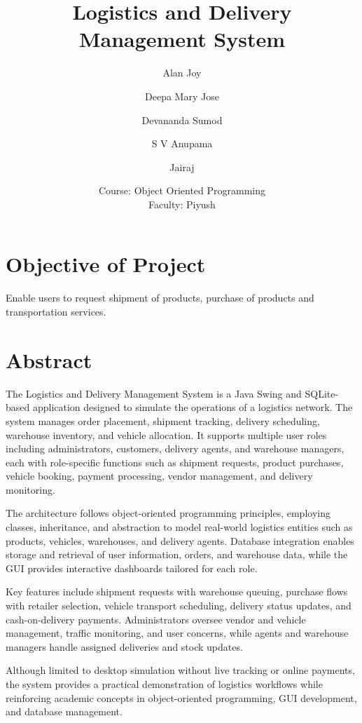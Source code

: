 \documentclass[12pt,a4paper]{article}
\begin{document}
\title{\textbf{Logistics and Delivery Management System}}
\author{
  Alan Joy \and
  Deepa Mary Jose \and
  Devananda Sumod \and
  S V Anupama \and
  Jairaj
}
\date{Course: Object Oriented Programming \\ Faculty: Piyush}
\maketitle


\section*{Objective of Project}
Enable users to request shipment of products, purchase of products and transportation services.

\section*{Abstract}
The Logistics and Delivery Management System is a Java Swing and SQLite-based application designed to simulate the operations of a logistics network. The system manages order placement, shipment tracking, delivery scheduling, warehouse inventory, and vehicle allocation. It supports multiple user roles including administrators, customers, delivery agents, and warehouse managers, each with role-specific functions such as shipment requests, product purchases, vehicle booking, payment processing, vendor management, and delivery monitoring.  

The architecture follows object-oriented programming principles, employing classes, inheritance, and abstraction to model real-world logistics entities such as products, vehicles, warehouses, and delivery agents. Database integration enables storage and retrieval of user information, orders, and warehouse data, while the GUI provides interactive dashboards tailored for each role.  

Key features include shipment requests with warehouse queuing, purchase flows with retailer selection, vehicle transport scheduling, delivery status updates, and cash-on-delivery payments. Administrators oversee vendor and vehicle management, traffic monitoring, and user concerns, while agents and warehouse managers handle assigned deliveries and stock updates.  

Although limited to desktop simulation without live tracking or online payments, the system provides a practical demonstration of logistics workflows while reinforcing academic concepts in object-oriented programming, GUI development, and database management.  
\end{document}
